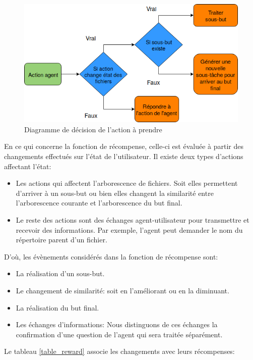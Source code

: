 \begin{figure}[H] 
	\centering
	\includegraphics[width=0.8\linewidth]{images/Conception/DM/action_diag.png}
	\caption{Diagramme de décision de l'action à prendre}\label{action_diag}
	
\end{figure}
En ce qui concerne la fonction de récompense, celle-ci est évaluée à partir des changements effectués sur l'état de l'utilisateur. Il existe deux types d'actions affectant l'état:
\begin{itemize}
	\item Les actions qui affectent l'arborescence de fichiers. Soit elles permettent d'arriver à un sous-but ou bien elles changent la similarité entre l'arborescence courante et l'arborescence du but final.
	\item Le reste des actions sont des échanges agent-utilisateur pour transmettre et recevoir des informations. Par exemple, l'agent peut demander le nom du répertoire parent d'un fichier.
\end{itemize}
D'où, les évènements considérés dans la fonction de récompense sont:
\begin{itemize}
	\item La réalisation d'un sous-but.
	\item Le changement de similarité: soit en l'améliorant ou en la diminuant.
	\item La réalisation du but final.
	\item Les échanges d'informations: Nous distinguons de ces échanges la confirmation d'une question de l'agent qui sera traitée séparément.
\end{itemize}
Le tableau \ref{table_reward} associe les changements avec leurs récompenses:
